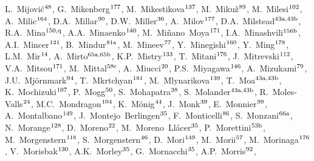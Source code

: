 \begin{flushleft}
L.~Mijovi\'{c}$^\textrm{\scriptsize 48}$,    
G.~Mikenberg$^\textrm{\scriptsize 177}$,    
M.~Mikestikova$^\textrm{\scriptsize 137}$,    
M.~Miku\v{z}$^\textrm{\scriptsize 89}$,    
M.~Milesi$^\textrm{\scriptsize 102}$,    
A.~Milic$^\textrm{\scriptsize 164}$,    
D.A.~Millar$^\textrm{\scriptsize 90}$,    
D.W.~Miller$^\textrm{\scriptsize 36}$,    
A.~Milov$^\textrm{\scriptsize 177}$,    
D.A.~Milstead$^\textrm{\scriptsize 43a,43b}$,    
R.A.~Mina$^\textrm{\scriptsize 150,q}$,    
A.A.~Minaenko$^\textrm{\scriptsize 140}$,    
M.~Mi\~nano~Moya$^\textrm{\scriptsize 171}$,    
I.A.~Minashvili$^\textrm{\scriptsize 156b}$,    
A.I.~Mincer$^\textrm{\scriptsize 121}$,    
B.~Mindur$^\textrm{\scriptsize 81a}$,    
M.~Mineev$^\textrm{\scriptsize 77}$,    
Y.~Minegishi$^\textrm{\scriptsize 160}$,    
Y.~Ming$^\textrm{\scriptsize 178}$,    
L.M.~Mir$^\textrm{\scriptsize 14}$,    
A.~Mirto$^\textrm{\scriptsize 65a,65b}$,    
K.P.~Mistry$^\textrm{\scriptsize 133}$,    
T.~Mitani$^\textrm{\scriptsize 176}$,    
J.~Mitrevski$^\textrm{\scriptsize 112}$,    
V.A.~Mitsou$^\textrm{\scriptsize 171}$,    
M.~Mittal$^\textrm{\scriptsize 58c}$,    
A.~Miucci$^\textrm{\scriptsize 20}$,    
P.S.~Miyagawa$^\textrm{\scriptsize 146}$,    
A.~Mizukami$^\textrm{\scriptsize 79}$,    
J.U.~Mj\"ornmark$^\textrm{\scriptsize 94}$,    
T.~Mkrtchyan$^\textrm{\scriptsize 181}$,    
M.~Mlynarikova$^\textrm{\scriptsize 139}$,    
T.~Moa$^\textrm{\scriptsize 43a,43b}$,    
K.~Mochizuki$^\textrm{\scriptsize 107}$,    
P.~Mogg$^\textrm{\scriptsize 50}$,    
S.~Mohapatra$^\textrm{\scriptsize 38}$,    
S.~Molander$^\textrm{\scriptsize 43a,43b}$,    
R.~Moles-Valls$^\textrm{\scriptsize 24}$,    
M.C.~Mondragon$^\textrm{\scriptsize 104}$,    
K.~M\"onig$^\textrm{\scriptsize 44}$,    
J.~Monk$^\textrm{\scriptsize 39}$,    
E.~Monnier$^\textrm{\scriptsize 99}$,    
A.~Montalbano$^\textrm{\scriptsize 149}$,    
J.~Montejo~Berlingen$^\textrm{\scriptsize 35}$,    
F.~Monticelli$^\textrm{\scriptsize 86}$,    
S.~Monzani$^\textrm{\scriptsize 66a}$,    
N.~Morange$^\textrm{\scriptsize 128}$,    
D.~Moreno$^\textrm{\scriptsize 22}$,    
M.~Moreno~Ll\'acer$^\textrm{\scriptsize 35}$,    
P.~Morettini$^\textrm{\scriptsize 53b}$,    
M.~Morgenstern$^\textrm{\scriptsize 118}$,    
S.~Morgenstern$^\textrm{\scriptsize 46}$,    
D.~Mori$^\textrm{\scriptsize 149}$,    
M.~Morii$^\textrm{\scriptsize 57}$,    
M.~Morinaga$^\textrm{\scriptsize 176}$,    
V.~Morisbak$^\textrm{\scriptsize 130}$,    
A.K.~Morley$^\textrm{\scriptsize 35}$,    
G.~Mornacchi$^\textrm{\scriptsize 35}$,    
A.P.~Morris$^\textrm{\scriptsize 92}$,    

\end{flushleft}

